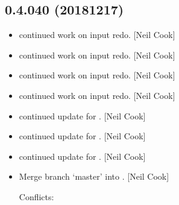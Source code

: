 \documentclass[a4paper,10pt,english]{report}
\begin{document}
\subsection{0.4.040 (2018\sphinxhyphen{}12\sphinxhyphen{}17)}
\label{\detokenize{misc/changelog:id248}}\begin{itemize}
\item {} 
 \sphinxhyphen{} continued work on input redo. {[}Neil Cook{]}

\item {} 
 \sphinxhyphen{} continued work on input redo. {[}Neil Cook{]}

\item {} 
 \sphinxhyphen{} continued work on input redo. {[}Neil Cook{]}

\item {} 
 \sphinxhyphen{} continued work on input redo. {[}Neil Cook{]}

\item {} 
 \sphinxhyphen{} continued update for . {[}Neil Cook{]}

\item {} 
 \sphinxhyphen{} continued update for . {[}Neil Cook{]}

\item {} 
 \sphinxhyphen{} continued update for . {[}Neil Cook{]}

\item {} 
Merge branch ‘master’ into . {[}Neil Cook{]}
\begin{description}
\item[{Conflicts:}] \leavevmode
{}

\end{description}

\end{itemize}
\end{document}

